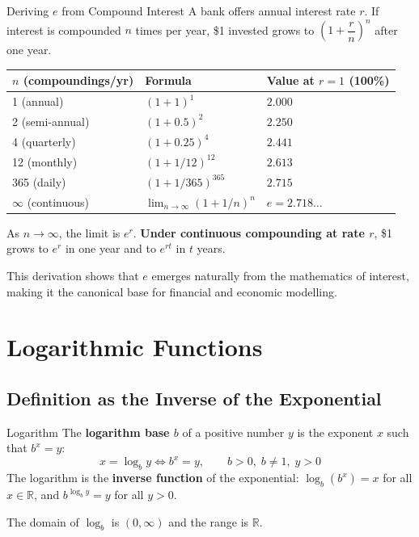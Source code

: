 \documentclass[12pt, a4paper]{article}
\theoremstyle{definition}
\newcommand{\R}{\mathbb{R}}
\begin{document}
\begin{exbox}{Deriving $e$ from Compound Interest}
A bank offers annual interest rate $r$. If interest is compounded $n$ times per year, \$1 invested grows to $\left(1 + \dfrac{r}{n}\right)^n$ after one year.

\begin{center}
\begin{tabular}{lll}
  \toprule
  \rowcolor{tabhead}
  \color{white}$n$ (compoundings/yr) & \color{white}Formula & \color{white}Value at $r=1$ (100\%) \\
  \midrule
  1 (annual) & $(1+1)^1$ & $2.000$ \\
  \rowcolor{tabeven}
  2 (semi-annual) & $(1+0.5)^2$ & $2.250$ \\
  4 (quarterly) & $(1+0.25)^4$ & $2.441$ \\
  \rowcolor{tabeven}
  12 (monthly) & $(1+1/12)^{12}$ & $2.613$ \\
  365 (daily) & $(1+1/365)^{365}$ & $2.715$ \\
  \rowcolor{tabeven}
  $\infty$ (continuous) & $\lim_{n\to\infty}(1+1/n)^n$ & $e = 2.718\ldots$ \\
  \bottomrule
\end{tabular}
\end{center}

As $n \to \infty$, the limit is $e^r$. \textbf{Under continuous compounding at rate $r$}, \$1 grows to $e^r$ in one year and to $e^{rt}$ in $t$ years.

This derivation shows that $e$ emerges naturally from the mathematics of interest, making it the canonical base for financial and economic modelling.
\end{exbox}

\section{Logarithmic Functions}

\subsection{Definition as the Inverse of the Exponential}

\begin{defbox}{Logarithm}
The \textbf{logarithm base $b$} of a positive number $y$ is the exponent $x$ such that $b^x = y$:
\[
  x = \log_b y \iff b^x = y, \qquad b > 0,\; b \neq 1,\; y > 0
\]
The logarithm is the \textbf{inverse function} of the exponential:
$\log_b(b^x) = x$ for all $x \in \R$, and $b^{\log_b y} = y$ for all $y > 0$.

The domain of $\log_b$ is $(0, \infty)$ and the range is $\R$.
\end{defbox}
\end{document}
